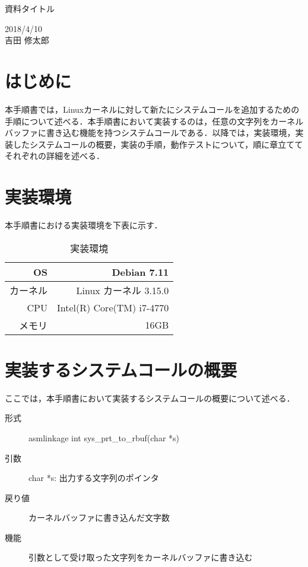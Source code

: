 \documentclass[12pt]{jsarticle}
\begin{document}
\begin{center}
{\LARGE 資料タイトル}
\end{center}

\begin{flushright}
  2018/4/10\\
  吉田 修太郎
\end{flushright}
\section{はじめに}
本手順書では，Linuxカーネルに対して新たにシステムコールを追加するための手順について述べる．本手順書において実装するのは，任意の文字列をカーネルバッファに書き込む機能を持つシステムコールである．以降では，実装環境，実装したシステムコールの概要，実装の手順，動作テストについて，順に章立ててそれぞれの詳細を述べる．

\section{実装環境}
本手順書における実装環境を下表に示す．
\begin{table}[h!]
  \begin{center}
    \caption{実装環境}%
    \begin{tabular}{r|r}
      \hline\hline
      OS & Debian 7.11 \\
      \hline
      カーネル & Linux カーネル 3.15.0 \\
      \hline
      CPU & Intel(R) Core(TM) i7-4770 \\
      \hline
      メモリ & 16GB\\
      \hline
    \end{tabular}
  \end{center}
\end{table}

\section{実装するシステムコールの概要}
ここでは，本手順書において実装するシステムコールの概要について述べる．
\begin{description}
\item[形式] asmlinkage int sys\_prt\_to\_rbuf(char *s)
\item[引数] char *s: 出力する文字列のポインタ
\item[戻り値] カーネルバッファに書き込んだ文字数
\item[機能] 引数として受け取った文字列をカーネルバッファに書き込む
  
\end{description}
\end{document}

